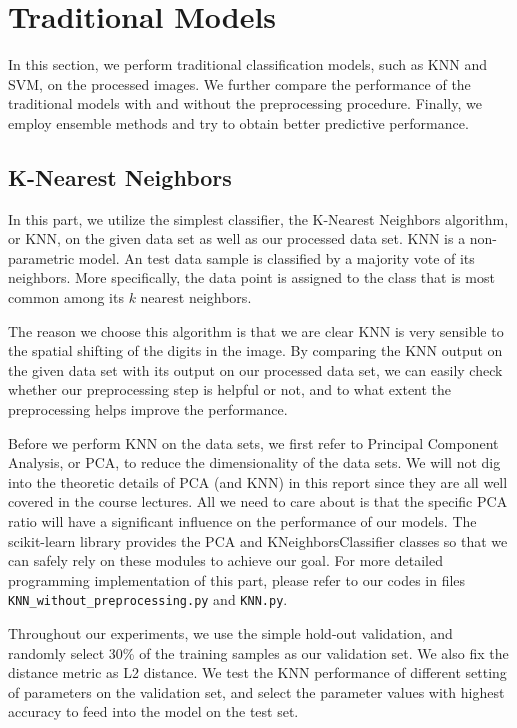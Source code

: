 \documentclass{article}
\begin{document}
\section{Traditional Models}
In this section, we perform traditional classification models, such as KNN and SVM, on the processed images. We further compare the performance of the traditional models with and without the preprocessing procedure. Finally, we employ ensemble methods and try to obtain better predictive performance.


\subsection{K-Nearest Neighbors}
In this part, we utilize the simplest classifier, the K-Nearest Neighbors algorithm, or KNN, on the given data set as well as our processed data set. KNN is a non-parametric model. An test data sample is classified by a majority vote of its neighbors. More specifically, the data point is assigned to the class that is most common among its $k$ nearest neighbors. 

The reason we choose this algorithm is that we are clear KNN is very sensible to the spatial shifting of the digits in the image. By comparing the KNN output on the given data set with its output on our processed data set, we can easily check whether our preprocessing step is helpful or not, and to what extent the preprocessing helps improve the performance. 

Before we perform KNN on the data sets, we first refer to Principal Component Analysis, or PCA, to reduce the dimensionality of the data sets. We will not dig into the theoretic details of PCA (and KNN) in this report since they are all well covered in the course lectures. All we need to care about is that the specific PCA ratio will have a significant influence on the performance of our models. The scikit-learn library provides the PCA and KNeighborsClassifier classes so that we can safely rely on these modules to achieve our goal. For more detailed programming implementation of this part, please refer to our codes in files \texttt{KNN\_without\_preprocessing.py} and \texttt{KNN.py}.

Throughout our experiments, we use the simple hold-out validation, and randomly select 30\% of the training samples as our validation set. We also fix the distance metric as L2 distance. We test the KNN performance of different setting of parameters on the validation set, and select the parameter values with highest accuracy to feed into the model on the test set.
\end{document}

